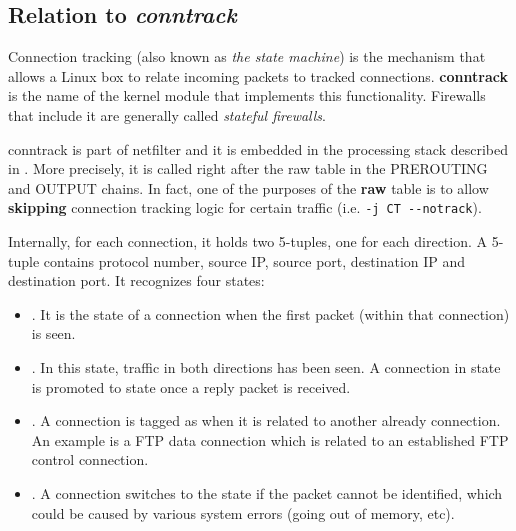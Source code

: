 \subsection{Relation to \emph{conntrack}}\label{sub-sec:conntrack}
\lstset{language=sh,basicstyle=\ttfamily}

Connection tracking (also known as \emph{the state machine}) is the mechanism
that allows a Linux box to relate incoming packets to tracked connections.
\textbf{conntrack} is the name of the kernel module that implements this
functionality.  Firewalls that include it are generally called \emph{stateful
firewalls}.

conntrack is part of netfilter and it is embedded in the processing stack
described in .  More
precisely, it is called right after the raw table in the PREROUTING and OUTPUT
chains.  In fact, one of the purposes of the \textbf{raw} table is to allow
\textbf{skipping} connection tracking logic for certain traffic (i.e.
\lstinline{-j CT --notrack}).

Internally, for each connection, it holds two 5-tuples, one for each direction.
A 5-tuple contains protocol number, source IP, source port, destination IP and
destination port.  It recognizes four states:
\begin{itemize}
  \item \NEW.  It is the state of a connection when the first packet
    (within that connection) is seen.
  \item \ESTABLISHED.  In this state, traffic in both directions has been seen.
    A connection in state \NEW is promoted to state \ESTABLISHED once a reply
    packet is received.
  \item \RELATED.  A connection is tagged as \RELATED when it is related to
    another already \ESTABLISHED connection.  An example is a FTP data
    connection which is related to an established FTP control connection.
  \item \INVALID.  A connection switches to the \INVALID state if the packet
    cannot be identified, which could be caused by various system errors (going
    out of memory, etc).
\end{itemize}

